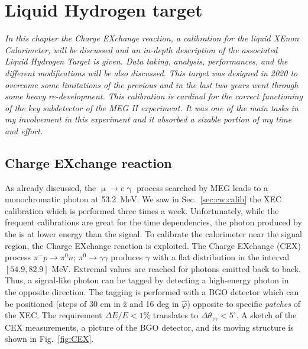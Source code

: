 \chapter{Liquid Hydrogen target}
\begin{refsection}
{\itshape In this chapter the Charge EXchange reaction, a calibration for the liquid XEnon Calorimeter, will be discussed and an in-depth description of the associated Liquid Hydrogen Target is given. 
Data taking, analysis, performances, and the different modifications will be also discussed.
This target was designed in 2020 to overcome some limitations of the previous and in the last two years went through some heavy re-development.
This calibration is cardinal for the correct functioning of the key subdetector of the MEG II experiment. It  was one of the main tasks in my involvement in this experiment and it absorbed a sizable portion of my time and effort.}

\section{Charge EXchange reaction}
    As already discussed, the $\upmu \rightarrow e\upgamma$ process searched by MEG leads to a monochromatic photon at \SI{53.2}{MeV}.
    We saw in Sec.~\ref{sec:cw:calib} the XEC calibration which is performed three times a week. 
    Unfortunately, while the frequent calibrations are great for the time dependencies, the photon produced by the  is at lower energy than the signal.
    To calibrate the calorimeter near the signal region, the Charge EXchange reaction is exploited.
    The Charge EXchange (CEX) process $\pi^-p\rightarrow \pi^0n$; $\pi^0\rightarrow\gamma\gamma$ produces $\gamma$ with a flat distribution in the interval $[54.9,82.9]$ MeV.
    Extremal values are reached for photons emitted back to back. Thus, a signal-like photon can be tagged by detecting a high-energy photon in the opposite direction.
    The tagging is performed with a BGO detector which can be positioned (steps of 30 cm in \^{z} and 16 deg in $\hat{\varphi}$) opposite to specific \textit{patches} of the XEC.
    The requirement $\Delta E/E< 1\%$ translates to $\Delta \theta_{\gamma\gamma}<5^\circ$.
    A sketch of the CEX measurements, a picture of the BGO detector, and its moving structure is shown in Fig.~\ref{fig:CEX}.


\end{refsection}
